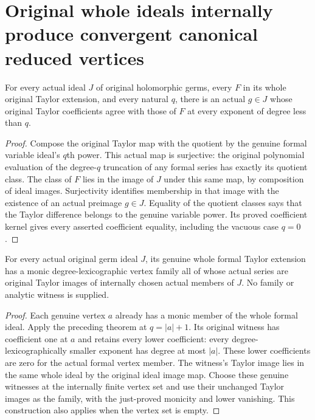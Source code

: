 \section{Original whole ideals internally produce convergent canonical reduced vertices}

\begin{theorem}
\label{hir:actual-original-ideal-finite-jet-lift}
\leanok
For every actual ideal $J$ of original holomorphic germs, every $F$ in
its whole original Taylor extension, and every natural $q$, there is an
actual $g\in J$ whose original Taylor coefficients agree with those of
$F$ at every exponent of degree less than $q$.
\end{theorem}
\begin{proof}
Compose the original Taylor map with the quotient by the genuine
formal variable ideal's $q$th power. This actual map is surjective:
the original polynomial evaluation of the degree-$q$ truncation of
any formal series has exactly its quotient class. The class of $F$
lies in the image of $J$ under this same map, by composition of ideal
images. Surjectivity identifies membership in that image with the
existence of an actual preimage $g\in J$. Equality of the quotient
classes says that the Taylor difference belongs to the genuine
variable power. Its proved coefficient kernel gives every asserted
coefficient equality, including the vacuous case $q=0$.
\end{proof}

\begin{theorem}
\label{hir:actual-original-monic-vertex-family}
\leanok
For every actual original germ ideal $J$, its genuine whole formal
Taylor extension has a monic degree-lexicographic vertex family all
of whose actual series are original Taylor images of internally
chosen actual members of $J$. No family or analytic witness is supplied.
\end{theorem}
\begin{proof}
Each genuine vertex $a$ already has a monic member of the whole formal
ideal. Apply the preceding theorem at $q=|a|+1$. Its original witness
has coefficient one at $a$ and retains every lower coefficient:
every degree-lexicographically smaller exponent has degree at most
$|a|$. These lower coefficients are zero for the actual formal vertex
member. The witness's Taylor image lies in the same whole ideal by
the original ideal image map. Choose these genuine witnesses at the
internally finite vertex set and use their unchanged Taylor images
as the family, with the just-proved monicity and lower vanishing.
This construction also applies when the vertex set is empty.
\end{proof}

